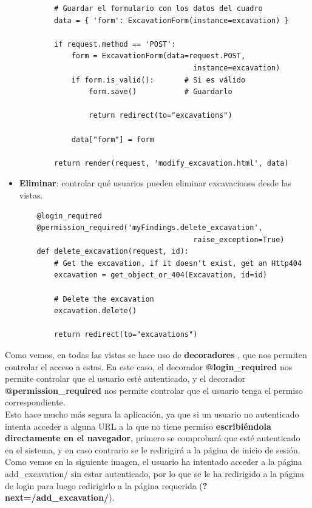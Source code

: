 \begin{itemize}
\begin{verbatim}
        # Guardar el formulario con los datos del cuadro
        data = { 'form': ExcavationForm(instance=excavation) }
    
        if request.method == 'POST':
            form = ExcavationForm(data=request.POST,
                                        instance=excavation)
            if form.is_valid():       # Si es válido
                form.save()           # Guardarlo
    
                return redirect(to="excavations")
    
            data["form"] = form
    
        return render(request, 'modify_excavation.html', data)
    \end{verbatim}

        \newpage \item \textbf{Eliminar}: controlar qué usuarios pueden eliminar excavaciones
        desde las vistas.
    
    \begin{verbatim}
    @login_required
    @permission_required('myFindings.delete_excavation',
                                        raise_exception=True)
    def delete_excavation(request, id):
        # Get the excavation, if it doesn't exist, get an Http404
        excavation = get_object_or_404(Excavation, id=id)
    
        # Delete the excavation
        excavation.delete()    
    
        return redirect(to="excavations")
    \end{verbatim}
    \end{itemize}

Como vemos, en todas las vistas se hace uso de \textbf{decoradores} \cite{decorators},
que nos permiten controlar el acceso a estas. En este caso, el decorador
\textbf{@login\_required} nos permite controlar que el usuario esté autenticado,
y el decorador \textbf{@permission\_required} nos permite controlar que el usuario
tenga el permiso correspondiente.\\

Esto hace mucho más segura la aplicación, ya que si un usuario no autenticado intenta
acceder a alguna URL a la que no tiene permiso \textbf{escribiéndola directamente en
el navegador}, primero se comprobará que esté autenticado en el sistema, y en caso
contrario se le redirigirá a la página de inicio de sesión. Como vemos en la siguiente
imagen, el usuario ha intentado acceder a la página add\_excavation/ sin estar autenticado,
por lo que se le ha redirigido a la página de login para luego redirigirlo a la página
requerida (\textbf{?next=/add\_excavation/}).

